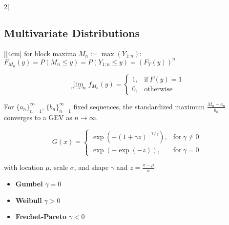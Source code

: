 \documentclass[8pt]{extarticle}
\begin{document}
\begin{multicols}{2}[\subsection{Multivariate Distributions}][4cm]
 \noindent for block maxima $M_n := \max(Y_{1:n})$: $F_{M_n}(y) = P(M_n\leq y) = P(Y_{1:n}\leq y) = (F_Y(y))^n$
 
 $$ \underset{n\rightarrow \infty}{\lim}f_{M_n}(y) =  \begin{cases}
      1, & \text{if}\ F(y)=1 \\
      0, & \text{otherwise}
    \end{cases}$$
    
    \noindent For $\{a_n\}^\infty_{n=1}$, $\{b_n\}^\infty_{n=1}$ fixed sequences, the standardized maximum $\frac{M_n - a_n}{b_n}$ converges to a GEV as $n\rightarrow\infty$.
    
    $$G(x) = \begin{cases}
      \exp(-(1+\gamma z)^{-1/\gamma}), & \text{for}\ \gamma \neq 0 \\
      \exp(-\exp(-z)), & \text{for}\ \gamma = 0 
    \end{cases}$$
    
    with location $\mu$, scale $\sigma$, and shape $\gamma$ and $z=\frac{x-\mu}{\sigma}$
    
    
  \begin{itemize}
  \item \textbf{Gumbel} $\gamma=0$
  \item \textbf{Weibull} $\gamma> 0$
  \item \textbf{Frechet-Pareto} $\gamma<0$
  \end{itemize}
    
    
    
 
 
 
 
 
 







\end{multicols}
\end{document}
